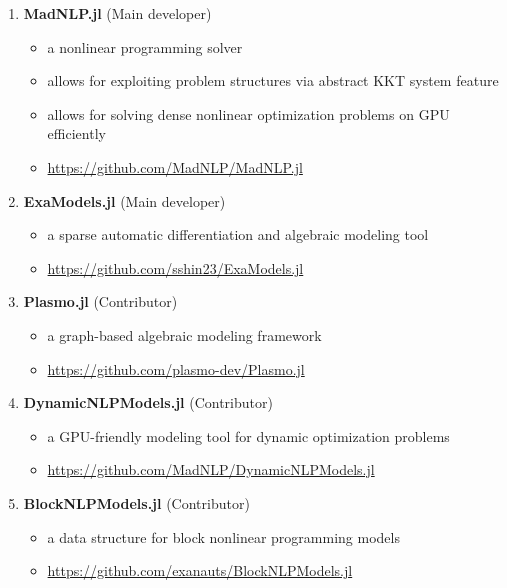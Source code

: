 \documentclass[letterpaper, 11pt]{article}
\begin{document}
\begin{enumerate}[itemsep=0pt]
\renewcommand*{\labelenumi}{[S\theenumi]}
\item {\bf MadNLP.jl} (Main developer)
  \begin{itemize}[leftmargin=*,topsep=0pt,label=$\bullet$,topsep=-5pt,itemsep=-1pt]
  \item a nonlinear programming solver
  \item allows for exploiting problem structures via abstract KKT system feature
  \item allows for solving dense nonlinear optimization problems on GPU efficiently
  \item \url{https://github.com/MadNLP/MadNLP.jl}
\end{itemize}
\item {\bf ExaModels.jl} (Main developer)
  \begin{itemize}[leftmargin=*,topsep=0pt,label=$\bullet$,topsep=-5pt,itemsep=-1pt]
  \item a sparse automatic differentiation and algebraic modeling tool
  \item \url{https://github.com/sshin23/ExaModels.jl}
  \end{itemize}
\item {\bf Plasmo.jl} (Contributor)
  \begin{itemize}[leftmargin=*,topsep=0pt,label=$\bullet$,topsep=-5pt,itemsep=-1pt]
  \item a graph-based algebraic modeling framework
  \item \url{https://github.com/plasmo-dev/Plasmo.jl}
  \end{itemize}
\item {\bf DynamicNLPModels.jl} (Contributor)
  \begin{itemize}[leftmargin=*,topsep=0pt,label=$\bullet$,topsep=-5pt,itemsep=-1pt]
  \item a GPU-friendly modeling tool for dynamic optimization problems
  \item \url{https://github.com/MadNLP/DynamicNLPModels.jl}
  \end{itemize}
\item {\bf BlockNLPModels.jl} (Contributor)
  \begin{itemize}[leftmargin=*,topsep=0pt,label=$\bullet$,topsep=-5pt,itemsep=-1pt]
  \item a data structure for block nonlinear programming models
  \item \url{https://github.com/exanauts/BlockNLPModels.jl}
  \end{itemize}

\end{enumerate}
\end{document}
